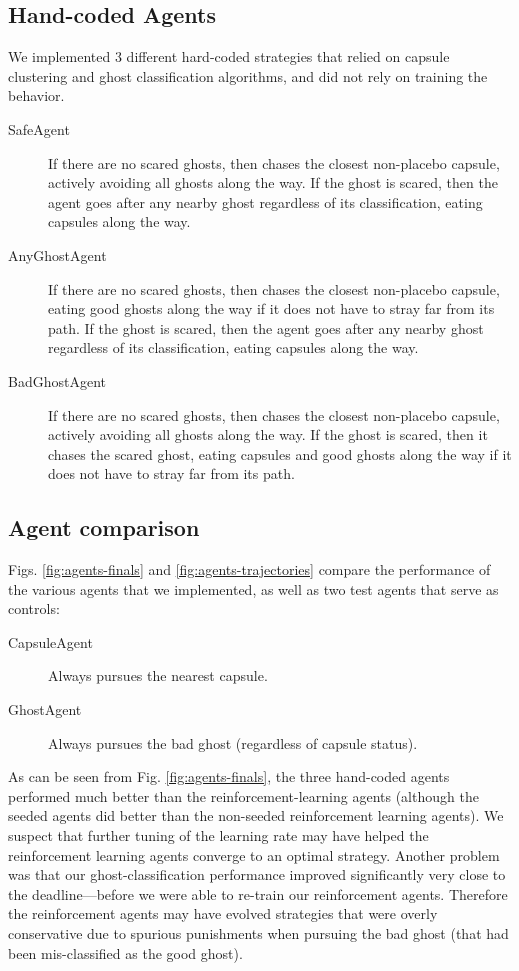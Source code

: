 \documentclass[11pt]{amsart}
\begin{document}
\subsection{Hand-coded Agents}

We implemented 3 different hard-coded strategies that relied on capsule clustering and ghost classification algorithms, and did not rely on training the behavior.
\begin{description}
	\item[SafeAgent] If there are no scared ghosts, then chases the closest non-placebo capsule, actively avoiding all ghosts along the way. If the ghost is scared, then the agent goes after any nearby ghost regardless of its classification, eating capsules along the way. 
	\item[AnyGhostAgent] If there are no scared ghosts, then chases the closest non-placebo capsule, eating good ghosts along the way if it does not have to stray far from its path. If the ghost is scared, then the agent goes after any nearby ghost regardless of its classification, eating capsules along the way. 
	\item[BadGhostAgent] If there are no scared ghosts, then chases the closest non-placebo capsule, actively avoiding all ghosts along the way. If the ghost is scared, then it chases the scared ghost, eating capsules and good ghosts along the way if it does not have to stray far from its path.
\end{description}

\subsection{Agent comparison}

Figs. \ref{fig:agents-finals} and \ref{fig:agents-trajectories} compare the performance of the various agents that we implemented, as well as two test agents that serve as controls:
\begin{description}
	\item[CapsuleAgent] Always pursues the nearest capsule.
	\item[GhostAgent] Always pursues the bad ghost (regardless of capsule status).
\end{description} 

As can be seen from Fig. \ref{fig:agents-finals}, the three hand-coded agents performed much better than the reinforcement-learning agents (although the seeded agents did better than the non-seeded reinforcement learning agents). We suspect that further tuning of the learning rate may have helped the reinforcement learning agents converge to an optimal strategy. Another problem was that our ghost-classification performance improved significantly very close to the deadline---before we were able to re-train our reinforcement agents. Therefore the reinforcement agents may have evolved strategies that were overly conservative due to spurious punishments when pursuing the bad ghost (that had been mis-classified as the good ghost).
\end{document}

